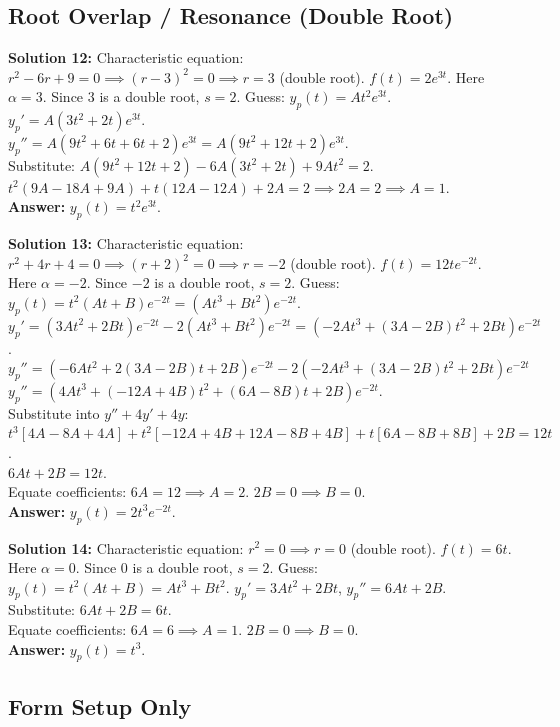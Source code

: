 \documentclass[11pt]{article}
\begin{document}
\subsection*{Root Overlap / Resonance (Double Root)}

\textbf{Solution 12:} 
Characteristic equation: $r^2 - 6r + 9 = 0 \implies (r-3)^2 = 0 \implies r = 3$ (double root). 
$f(t) = 2e^{3t}$. Here $\alpha=3$. Since $3$ is a double root, $s=2$. 
Guess: $y_p(t) = At^2e^{3t}$. 
$y_p' = A(3t^2 + 2t)e^{3t}$. \\
$y_p'' = A(9t^2 + 6t + 6t + 2)e^{3t} = A(9t^2 + 12t + 2)e^{3t}$. \\
Substitute: $A(9t^2 + 12t + 2) - 6A(3t^2 + 2t) + 9At^2 = 2$. \\
$t^2(9A - 18A + 9A) + t(12A - 12A) + 2A = 2 \implies 2A = 2 \implies A = 1$. \\
\textbf{Answer:} $y_p(t) = t^2e^{3t}$.

\textbf{Solution 13:} 
Characteristic equation: $r^2 + 4r + 4 = 0 \implies (r+2)^2 = 0 \implies r = -2$ (double root). 
$f(t) = 12te^{-2t}$. Here $\alpha=-2$. Since $-2$ is a double root, $s=2$. 
Guess: $y_p(t) = t^2(At + B)e^{-2t} = (At^3 + Bt^2)e^{-2t}$. 
$y_p' = (3At^2 + 2Bt)e^{-2t} - 2(At^3 + Bt^2)e^{-2t} = (-2At^3 + (3A-2B)t^2 + 2Bt)e^{-2t}$. \\
$y_p'' = (-6At^2 + 2(3A-2B)t + 2B)e^{-2t} - 2(-2At^3 + (3A-2B)t^2 + 2Bt)e^{-2t}$ \\
$y_p'' = (4At^3 + (-12A+4B)t^2 + (6A-8B)t + 2B)e^{-2t}$. \\
Substitute into $y'' + 4y' + 4y$: \\
$t^3[4A - 8A + 4A] + t^2[-12A+4B + 12A-8B + 4B] + t[6A-8B + 8B] + 2B = 12t$. \\
$6At + 2B = 12t$. \\
Equate coefficients: $6A = 12 \implies A = 2$. $2B = 0 \implies B = 0$. \\
\textbf{Answer:} $y_p(t) = 2t^3e^{-2t}$.

\textbf{Solution 14:} 
Characteristic equation: $r^2 = 0 \implies r = 0$ (double root). 
$f(t) = 6t$. Here $\alpha=0$. Since $0$ is a double root, $s=2$. 
Guess: $y_p(t) = t^2(At + B) = At^3 + Bt^2$. 
$y_p' = 3At^2 + 2Bt$, $y_p'' = 6At + 2B$. 
Substitute: $6At + 2B = 6t$. \\
Equate coefficients: $6A = 6 \implies A = 1$. $2B = 0 \implies B = 0$. \\
\textbf{Answer:} $y_p(t) = t^3$.

\subsection*{Form Setup Only}
\end{document}
